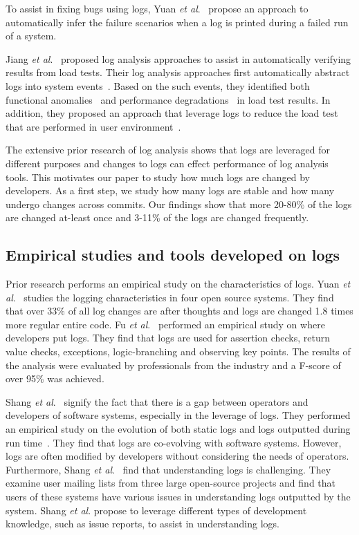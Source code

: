To assist in fixing bugs using logs, Yuan \emph{et al$.$}~\cite{Yuan:2010:SED:1736020.1736038} propose an approach to automatically infer the failure scenarios when a log is printed during a failed run of a system.


Jiang \textsl{et al$ . $}~\cite{Jiang:2008:AAA:1400155.1400158,JiangICSM2008,JiangICSM20092,Jiang:2010:ICS:1850000.1850068} proposed log analysis approaches to assist in automatically verifying results from load tests. Their log analysis approaches first automatically abstract logs into system events~\cite{Jiang:2008:AAA:1400155.1400158}. Based on the such events, they identified both functional anomalies~\cite{JiangICSM2008} and performance degradations~\cite{JiangICSM20092} in load test results. In addition, they proposed an approach that leverage logs to reduce the load test that are performed in user environment~\cite{Jiang:2010:ICS:1850000.1850068}.

The extensive prior research of log analysis shows that logs are leveraged for different purposes and changes to logs can effect performance  of log analysis tools. This motivates our paper to study how much logs are changed by developers. As a first step, we study how many logs are stable and how many undergo changes across commits. Our findings show that more 20-80\% of the logs are changed at-least once and 3-11\% of the logs are changed frequently. 


\subsection{Empirical studies and tools developed on logs}


Prior research performs an empirical study on the characteristics of logs. Yuan \textsl{et al}$ . $~\cite{Characterizinglogs} studies the logging characteristics in four open source systems. They find that over 33\% of all log changes are after thoughts and logs are changed 1.8 times more regular entire code. Fu \textsl{et al$.$}~\cite{Fu1} performed an empirical study on where developers put logs. They find that logs are used for assertion checks, return value checks, exceptions, logic-branching and observing key points. The results of the analysis were evaluated by professionals from the industry and a F-score of over 95\% was achieved. 


Shang \textsl{et al$ . $}~\cite{IanGap} signify the fact that there is a gap between operators and developers of software systems, especially in the leverage of logs. They performed an empirical study on the evolution of both static logs and logs outputted during run time~\cite{EMSEIAN,PaperIanCIIII}. They find that logs are co-evolving with software systems. However, logs are often modified by developers without considering the needs of operators. Furthermore, Shang\textsl{ et al$ . $}~\cite{IanIcesm} find that understanding logs is challenging. They examine user mailing lists from three large open-source projects and find that users of these systems have various issues in understanding logs outputted by the system. Shang\textsl{ et al$ . $} propose to leverage different types of development knowledge, such as issue reports, to assist in understanding logs. 

